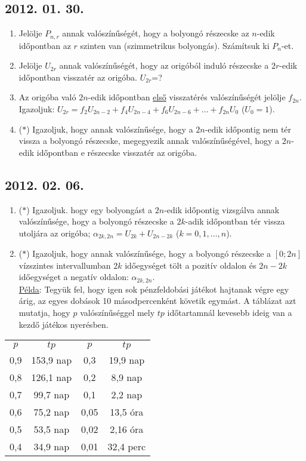 \subsection*{2012. 01. 30.}
\begin{enumerate}
\item
Jelölje $P_{n,r}$ annak valószínűségét, hogy a bolyongó részecske az $n$-edik időpontban az $r$ szinten van (szimmetrikus bolyongás). Számítsuk ki $P_{n}$-et.
\item
Jelölje $U_{2r}$ annak valószínűségét, hogy az origóból induló részecske a $2r$-edik időpontban visszatér az origóba. $U_{2r}$=?
\item
Az origóba való $2n$-edik időpontban \underline{első} visszatérés valószínűségét jelölje $f_{2n}$. Igazoljuk: $U_{2r}=f_{2}U_{2n-2}+f_{4}U_{2n-4}+f_{6}U_{2n-6}+\ldots+f_{2n}U_{0}$ ($U_{0}=1$).
\item ($*$)
Igazoljuk, hogy annak valószínűsége, hogy a $2n$-edik  időpontig nem tér vissza a bolyongó részecske, megegyezik annak valószínűségével, hogy a $2n$-edik időpontban e részecske visszatér az origóba.
\end{enumerate}

\subsection*{2012. 02. 06.}
\begin{enumerate}
\item ($*$)
Igazoljuk. hogy egy bolyongást a $2n$-edik időpontig vizsgálva annak valószínűsége, hogy a bolyongó részecske a $2k$-adik időpontban tér vissza utoljára az origóba;
$\alpha_{2k,2n}=U_{2k}+U_{2n-2k}$ ($k=0,1,\ldots,n$).
\item ($*$)
Igazoljuk, hogy annak valószínűsége, hogy a bolyongó részecske a $[0;2n]$ vízszintes intervallumban $2k$ időegységet tölt a pozitív oldalon és $2n-2k$ időegységet a negatív oldalon: $\alpha_{2k,2n}$.\\
\underline{Példa}: Tegyük fel, hogy igen sok pénzfeldobási játékot hajtanak végre egy árig, az egyes dobások 10 másodpercenként követik egymást. A táblázat azt mutatja, hogy $p$ valószínűséggel mely $tp$ időtartamnál kevesebb ideig van a kezdő játékos nyerésben.
\end{enumerate}
\begin{center}
\begin{tabular}{ c c | c c}
 $p$ & $tp$ & $p$ & $tp$ \\
 0,9 & 153,9 nap & 0,3 & 19,9 nap \\
 0,8 & 126,1 nap & 0,2 & 8,9 nap \\
 0,7 & 99,7 nap & 0,1 & 2,2 nap \\
 0,6 & 75,2 nap & 0,05 & 13,5 óra \\
 0,5 & 53,5 nap & 0,02 & 2,16 óra \\
 0,4 & 34,9 nap & 0,01 & 32,4 perc \\
\end{tabular}
\end{center}

